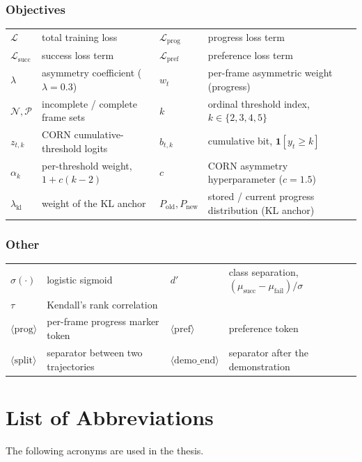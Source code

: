 \subsection*{Objectives}
\begin{tabular}{@{}p{1.9cm}p{6.0cm}p{1.9cm}p{6.0cm}@{}}
$\mathcal{L}$ & total training loss & $\mathcal{L}_{\mathrm{prog}}$ & progress loss term \\
$\mathcal{L}_{\mathrm{succ}}$ & success loss term & $\mathcal{L}_{\mathrm{pref}}$ & preference loss term \\
$\lambda$ & asymmetry coefficient ($\lambda=0.3$) & $w_t$ & per-frame asymmetric weight (progress) \\
$\mathcal{N},\mathcal{P}$ & incomplete / complete frame sets & $k$ & ordinal threshold index, $k\in\{2,3,4,5\}$ \\
$z_{t,k}$ & CORN cumulative-threshold logits & $b_{t,k}$ & cumulative bit, $\mathbf{1}[y_t\ge k]$ \\
$\alpha_k$ & per-threshold weight, $1+c(k-2)$ & $c$ & CORN asymmetry hyperparameter ($c=1.5$) \\
$\lambda_{\mathrm{kl}}$ & weight of the KL anchor & $P_{\mathrm{old}},P_{\mathrm{new}}$ & stored / current progress distribution (KL anchor) \\
\end{tabular}

\subsection*{Other}
\begin{tabular}{@{}p{1.9cm}p{6.0cm}p{1.9cm}p{6.0cm}@{}}
$\sigma(\cdot)$ & logistic sigmoid & $d'$ & class separation, $(\mu_{\mathrm{succ}}-\mu_{\mathrm{fail}})/\sigma$ \\
$\tau$ & Kendall's rank correlation & & \\
$\langle\mathrm{prog}\rangle$ & per-frame progress marker token & $\langle\mathrm{pref}\rangle$ & preference token \\
$\langle\mathrm{split}\rangle$ & separator between two trajectories & $\langle\mathrm{demo\_end}\rangle$ & separator after the demonstration \\
\end{tabular}


\chapter{List of Abbreviations}
The following acronyms are used in the thesis.

